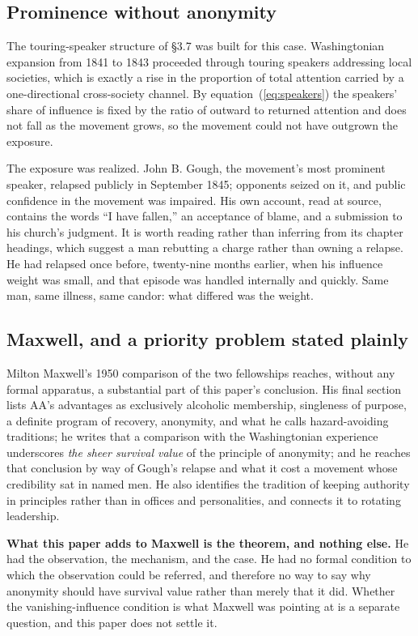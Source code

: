 \documentclass[11pt,a4paper]{article}
\begin{document}
\subsection{Prominence without anonymity}

The touring-speaker structure of \S3.7 was built for this case. Washingtonian
expansion from 1841 to 1843 proceeded through touring speakers addressing local
societies, which is exactly a rise in the proportion of total attention carried by
a one-directional cross-society channel. By equation~(\ref{eq:speakers}) the
speakers' share of influence is fixed by the ratio of outward to returned
attention and does not fall as the movement grows, so the movement could not have
outgrown the exposure.

The exposure was realized. John B. Gough, the movement's most prominent speaker,
relapsed publicly in September 1845; opponents seized on it, and public confidence
in the movement was impaired. His own account, read at source, contains the words
``I have fallen,'' an acceptance of blame, and a submission to his church's
judgment. It is worth reading rather than inferring from its chapter headings,
which suggest a man rebutting a charge rather than owning a relapse. He had
relapsed once before, twenty-nine months earlier, when his influence weight was
small, and that episode was handled internally and quickly. Same man, same
illness, same candor: what differed was the weight.

\subsection{Maxwell, and a priority problem stated plainly}

Milton Maxwell's 1950 comparison of the two fellowships reaches, without any
formal apparatus, a substantial part of this paper's conclusion. His final section
lists AA's advantages as exclusively alcoholic membership, singleness of purpose,
a definite program of recovery, anonymity, and what he calls hazard-avoiding
traditions; he writes that a comparison with the Washingtonian experience
underscores \emph{the sheer survival value} of the principle of anonymity; and he
reaches that conclusion by way of Gough's relapse and what it cost a movement
whose credibility sat in named men. He also identifies the tradition of keeping
authority in principles rather than in offices and personalities, and connects it
to rotating leadership.

\textbf{What this paper adds to Maxwell is the theorem, and nothing else.} He had
the observation, the mechanism, and the case. He had no formal condition to which
the observation could be referred, and therefore no way to say why anonymity
should have survival value rather than merely that it did. Whether the
vanishing-influence condition is what Maxwell was pointing at is a separate
question, and this paper does not settle it.
\end{document}

